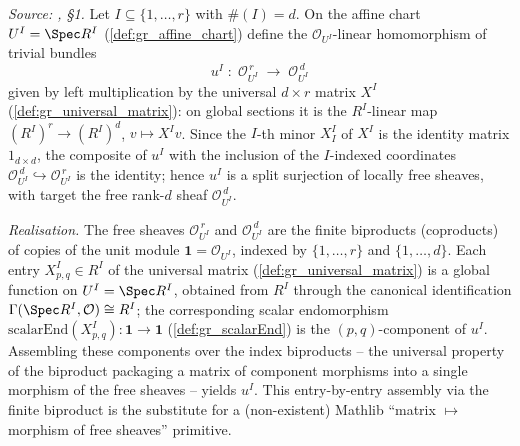 \begin{definition}\leanok
  \label{def:gr_chart_quotient}
  \textit{Source: \cite{nitsure-hilbert-quot}, \S 1.}
  Let \(I \subseteq \{1,\dots,r\}\) with \(\#(I) = d\). On the affine chart
  \(U^I = \Spec R^I\) (\cref{def:gr_affine_chart}) define the
  \(\mathcal{O}_{U^I}\)-linear homomorphism of trivial bundles
  \[
    u^I \;:\; \mathcal{O}_{U^I}^{\,r}
      \;\longrightarrow\; \mathcal{O}_{U^I}^{\,d}
  \]
  given by left multiplication by the universal \(d \times r\) matrix \(X^I\)
  (\cref{def:gr_universal_matrix}): on global sections it is the \(R^I\)-linear
  map \((R^I)^{r} \to (R^I)^{d}\), \(v \mapsto X^I v\). Since the \(I\)-th minor
  \(X^I_I\) of \(X^I\) is the identity matrix \(1_{d \times d}\), the composite of
  \(u^I\) with the inclusion of the \(I\)-indexed coordinates
  \(\mathcal{O}_{U^I}^{\,d} \hookrightarrow \mathcal{O}_{U^I}^{\,r}\) is the
  identity; hence \(u^I\) is a split surjection of locally free sheaves, with
  target the free rank-\(d\) sheaf \(\mathcal{O}_{U^I}^{\,d}\).

  \emph{Realisation.} The free sheaves \(\mathcal{O}_{U^I}^{\,r}\) and
  \(\mathcal{O}_{U^I}^{\,d}\) are the finite biproducts (coproducts) of copies of
  the unit module \(\mathbf{1} = \mathcal{O}_{U^I}\), indexed by \(\{1,\dots,r\}\)
  and \(\{1,\dots,d\}\). Each entry \(X^I_{p,q} \in R^I\) of the universal matrix
  (\cref{def:gr_universal_matrix}) is a global function on \(U^I = \Spec R^I\),
  obtained from \(R^I\) through the canonical identification
  \(\Gamma(\Spec R^I, \mathcal{O}) \cong R^I\); the corresponding scalar
  endomorphism \(\mathrm{scalarEnd}(X^I_{p,q}) : \mathbf{1} \to \mathbf{1}\)
  (\cref{def:gr_scalarEnd}) is the \((p,q)\)-component of \(u^I\). Assembling these
  components over the index biproducts -- the universal property of the biproduct
  packaging a matrix of component morphisms into a single morphism of the free
  sheaves -- yields \(u^I\). This entry-by-entry assembly via the finite biproduct
  is the substitute for a (non-existent) Mathlib ``matrix \(\mapsto\) morphism of
  free sheaves'' primitive.
\end{definition}


